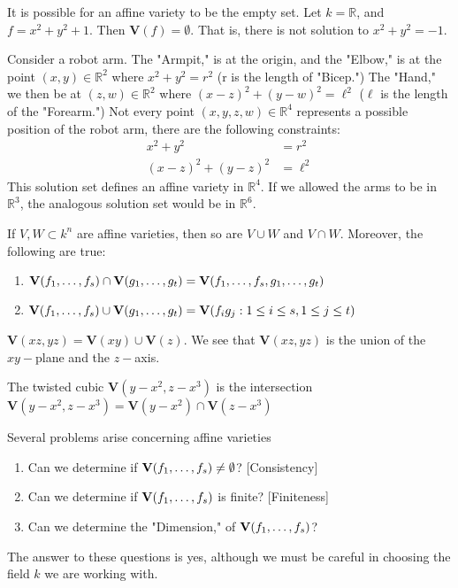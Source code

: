 \documentclass[../main.tex]{subfiles}
\begin{document}
%
\begin{remark}
It is possible for an affine variety to be the empty set. Let $k = \mathbb{R}$, and $f = x^2+y^2+1$. Then $\mathbf{V}(f) = \emptyset$. That is, there is not solution to $x^2+y^2 = -1$.
\end{remark}
%
\begin{example}
Consider a robot arm. The "Armpit," is at the origin, and the "Elbow," is at the point $(x,y)\in \mathbb{R}^2$ where $x^2+y^2 = r^2$ (r is the length of "Bicep.") The "Hand," we then be at $(z,w)\in \mathbb{R}^2$ where $(x-z)^2 + (y-w)^2 = \ell^2$ ($\ell$ is the length of the "Forearm.") Not every point $(x,y,z,w)\in \mathbb{R}^4$ represents a possible position of the robot arm, there are the following constraints:
\begin{align}
\nonumber x^2+y^2 &= r^2 \\ 
\nonumber (x-z)^2+(y-z)^2 &= \ell^2
\end{align}
This solution set defines an affine variety in $\mathbb{R}^4$. If we allowed the arms to be in $\mathbb{R}^3$, the analogous solution set would be in $\mathbb{R}^6$.
\end{example}
%
\begin{theorem}
If $V,W\subset k^n$ are affine varieties, then so are $V\cup W$ and $V\cap W$. Moreover, the following are true:
\begin{enumerate}
\item $\textbf{V}(f_1,\hdots, f_s) \cap \textbf{V}(g_1,\hdots, g_t) = \mathbf{V}(f_1,\hdots, f_s,g_1,\hdots, g_t)$
\item $\textbf{V}(f_1,\hdots, f_s) \cup \textbf{V}(g_1,\hdots, g_t) = \mathbf{V}(f_i g_j: 1\leq i \leq s, 1\leq j\leq t)$
\end{enumerate}
\end{theorem}
%
\begin{example}
$\mathbf{V}(xz,yz) = \mathbf{V}(xy)\cup \mathbf{V}(z)$. We see that $\mathbf{V}(xz,yz)$ is the union of the $xy-$plane and the $z-$axis.
\end{example}
%
\begin{example}
The twisted cubic $\mathbf{V}(y-x^2,z-x^3)$ is the intersection $\mathbf{V}(y-x^2,z-x^3) = \mathbf{V}(y-x^2)\cap \mathbf{V}(z-x^3)$
\end{example}
%
Several problems arise concerning affine varieties
%
\begin{enumerate}
\item Can we determine if $\textbf{V}(f_1,\hdots, f_s) \ne \emptyset$? \hfill [Consistency]
\item Can we determine if $\textbf{V}(f_1,\hdots, f_s)$ is finite? \hfill [Finiteness]
\item Can we determine the "Dimension," of $\textbf{V}(f_1,\hdots, f_s)$?
\end{enumerate}
%
The answer to these questions is yes, although we must be careful in choosing the field $k$ we are working with. 
%
\end{document}
